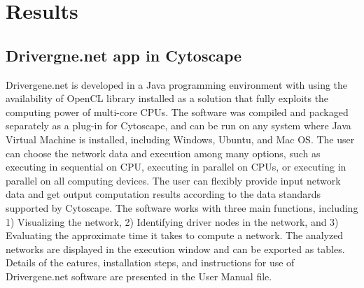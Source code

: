 \documentclass[5p,,preprint,12pt]{elsarticle}
\begin{document}
\section{Results}
\subsection{Drivergne.net app in Cytoscape}
Drivergene.net is developed in a Java programming environment with using the availability of OpenCL library installed as a solution that fully exploits the computing power of multi-core CPUs. The software was compiled and packaged separately as a plug-in for Cytoscape, and can be run on any system where Java Virtual Machine is installed, including Windows, Ubuntu, and Mac OS. The user can choose the network data and execution among many options, such as executing in sequential on CPU, executing in parallel on CPUs, or executing in parallel on all computing devices. The user can flexibly provide input network data and get output computation results according to the data standards supported by Cytoscape. The software works with three main functions, including 1) Visualizing the network, 2) Identifying driver nodes in the network, and 3) Evaluating the approximate time it takes to compute a network. The analyzed networks are displayed in the execution window and can be exported as tables. Details of the eatures, installation steps, and instructions for use of Drivergene.net software are presented in the User Manual file. 
\end{document}
